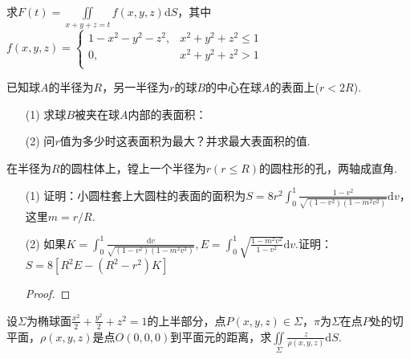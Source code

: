 \begin{xiti}
	\item 求$F(t)=\iint\limits_{x+y+z=t} f(x, y, z) \mathrm{d} S$，其中$f\left(x,y,z\right)=\left\{\begin{matrix}
	1-x^2-y^2-z^2,&x^2+y^2+z^2\le 1\\
	0,&		x^2+y^2+z^2>1\\
	\end{matrix}\right. $
	\begin{solution}
	\end{solution}
	
	\item 已知球$A$的半径为$R$，另一半径为$r$的球$B$的中心在球$A$的表面上($r<2R$).
	\begin{enumerate}
		\item [(1)]求球$B$被夹在球$A$内部的表面积：
		\begin{solution}
		\end{solution}
		
		\item [(2)]问$r$值为多少时这表面积为最大？并求最大表面积的值.
		\begin{solution}
		\end{solution}
		
	\end{enumerate}	
	\item 在半径为$R$的圆柱体上，镗上一个半径为$r(r\leq R)$的圆柱形的孔，两轴成直角.
	\begin{enumerate}
		\item [(1)]证明：小圆柱套上大圆柱的表面的面积为$S=8 r^{2} \int_{0}^{1} \frac{1-v^{2}}{\sqrt{\left(1-v^{2}\right)\left(1-m^{2} v^{2}\right)}} \mathrm{d} v$，这里$m=r/R$.
		\begin{solution}
		\end{solution}
		
		\item [(2)]如果$K=\int_{0}^{1} \frac{\mathrm{d} v}{\sqrt{\left(1-v^{2}\right)\left(1-m^{2} v^{2}\right)}},  E=\int_{0}^{1} \sqrt{\frac{1-m^{2} v^{2}}{1-v^{2}}} \mathrm{d} v$.证明：$S=8\left[R^{2} E-\left(R^{2}-r^{2}\right) K\right]$
		\begin{proof}
		\end{proof}
		
	\end{enumerate}
	
		
	\item 	设$\Sigma$为椭球面$\frac{x^{2}}{2}+\frac{y^{2}}{2}+z^{2}=1$的上半部分，点$P(x, y, z) \in \Sigma$，$\pi $为$\Sigma$在点$P$处的切平面，$\rho(x, y, z)$是点$O(0,0,0)$到平面元的距离，求$\iint\limits_{\Sigma} \frac{z}{\rho(x, y, z)} \mathrm{d} S$.
	\begin{solution}
	\end{solution}
	

\end{xiti}

